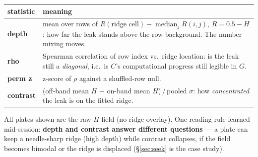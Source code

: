\documentclass[11pt]{article}
\begin{document}
\begin{center}\small
\begin{tabular}{lp{11.2cm}}
\toprule
statistic & meaning\\
\midrule
\textbf{depth} & mean over rows of $R(\text{ridge cell})-\operatorname{median}_j R(i,j)$, $R=0.5-H$:
how far the leak stands above the row background. The number mixing moves.\\
\textbf{rho} & Spearman correlation of row index vs.\ ridge location: is the leak still a
\emph{diagonal}, i.e.\ is $C$'s computational progress still legible in $G$.\\
\textbf{perm z} & z-score of $\rho$ against a shuffled-row null.\\
\textbf{contrast} & (off-band mean $H$ $-$ on-band mean $H$)\,/\,pooled $\sigma$: how
\emph{concentrated} the leak is on the fitted ridge.\\
\bottomrule
\end{tabular}
\end{center}

All plates shown are the raw $H$ field (no ridge overlay). One reading rule learned mid-session:
\textbf{depth and contrast answer different questions} --- a plate can keep a needle-sharp ridge
(high depth) while contrast collapses, if the field becomes bimodal or the ridge is displaced
(\S\ref{sec:seek} is the case study).
\end{document}
